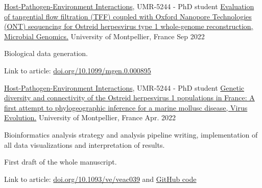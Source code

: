 

\begin{cventries}

  \cventry
    {\href{http://ihpe.univ-perp.fr/}{Host-Pathogen-Environment Interactions}, UMR-5244 - PhD student} %
    {\href{https://www.microbiologyresearch.org/}{Evaluation of tangential flow filtration (TFF) coupled with Oxford Nanopore Technologies (ONT) sequencing for Ostreid herpesvirus type 1 whole-genome reconstruction, Microbial Genomics.}} %
    {University of Montpellier, France} %
    {Sep 2022} %
    {
      \begin{cvitems} %
        \item {Biological data generation.}
        \item Link to article: {\href{https://doi.org/10.1099/mgen.0.000895}{doi.org/10.1099/mgen.0.000895}}
      \end{cvitems}
    }

  \cventry
    {\href{http://ihpe.univ-perp.fr/}{Host-Pathogen-Environment Interactions}, UMR-5244 - PhD student} %
    {\href{https://doi.org/10.1093/ve/veac039}{Genetic diversity and connectivity of the Ostreid herpesvirus 1 populations in France: A first attempt to phylogeographic inference for a marine mollusc disease, Virus Evolution.}} %
    {University of Montpellier, France} %
    {Apr. 2022} %
    {
      \begin{cvitems} %
        \item {Bioinformatics analysis strategy and analysis pipeline writing, implementation of all data visualizations and interpretation of results.}
        \item {First draft of the whole manuscript.}
        \item Link to article: {\href{https://doi.org/10.1093/ve/veac039}{doi.org/10.1093/ve/veac039} and  \href{https://github.com/propan2one/OshV-1-molepidemio}{GitHub code}}
      \end{cvitems}
    }
    

\end{cventries}
